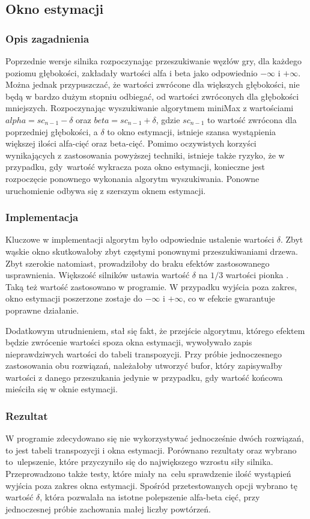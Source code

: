 \subsection{Okno estymacji}
\label{subsec:okno-estymacji}

\subsubsection{Opis zagadnienia}
Poprzednie wersje silnika rozpoczynając przeszukiwanie węzłów gry, dla każdego poziomu głębokości, zakładały wartości alfa i beta jako odpowiednio $-\infty$ i $+\infty$.
Można jednak przypuszczać, że wartości zwrócone dla większych głębokości, nie będą w bardzo dużym stopniu odbiegać, od wartości zwróconych dla głębokości mniejszych.
Rozpoczynając wyszukiwanie algorytmem miniMax z wartościami $alpha = sc_{n-1} - \delta$ oraz $beta = sc_{n-1} + \delta$, gdzie $sc_{n-1}$ to wartość zwrócona dla poprzedniej głębokości, a $\delta$ to okno estymacji, istnieje szansa wystąpienia większej ilości alfa-cięć oraz beta-cięć.
Pomimo oczywistych korzyści wynikających z zastosowania powyższej techniki, istnieje także ryzyko, że w przypadku, gdy~wartość wykracza poza okno estymacji, konieczne jest rozpoczęcie ponownego wykonania algorytm wyszukiwania.
Ponowne uruchomienie odbywa się z szerszym oknem estymacji.

\subsubsection{Implementacja}
Kluczowe w implementacji algorytm było odpowiednie ustalenie wartości $\delta$.
Zbyt wąskie okno skutkowałoby zbyt częstymi ponownymi przeszukiwaniami drzewa.
Zbyt szerokie natomiast, prowadziłoby do braku efektów zastosowanego usprawnienia.
Większość silników ustawia wartość $\delta$ na $1/3$ wartości pionka \cite*{duch}.
Taką też wartość zastosowano w programie.
W przypadku wyjścia poza zakres, okno estymacji poszerzone zostaje do $-\infty$ i $+\infty$, co w efekcie gwarantuje poprawne działanie.

Dodatkowym utrudnieniem, stał się fakt, że przejście algorytmu, którego efektem będzie zwrócenie wartości spoza okna estymacji, wywoływało zapis nieprawdziwych wartości do tabeli transpozycji.
Przy próbie jednoczesnego zastosowania obu rozwiązań, należałoby utworzyć bufor, który zapisywałby wartości z danego przeszukania jedynie w przypadku, gdy wartość końcowa mieściła się w oknie estymacji.

\subsubsection{Rezultat}
W programie zdecydowano się nie wykorzystywać jednocześnie dwóch rozwiązań, to jest tabeli transpozycji i okna estymacji.
Porównano rezultaty oraz wybrano to~ulepszenie, które przyczyniło się do największego wzrostu siły silnika.
Przeprowadzono także testy, które miały na~celu sprawdzenie ilość wystąpień wyjścia poza zakres okna estymacji.
Spośród przetestowanych opcji wybrano tę wartość $\delta$, która pozwalała na istotne polepszenie alfa-beta cięć, przy jednoczesnej próbie zachowania małej liczby powtórzeń.